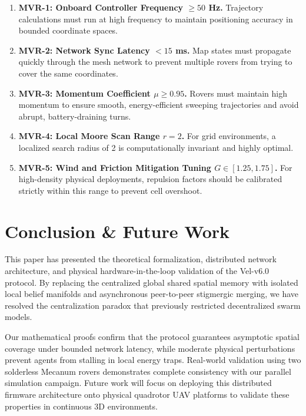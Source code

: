 \documentclass[letterpaper, 10pt, conference]{IEEEtran}
\begin{document}
\begin{enumerate}
    \item \textbf{MVR-1: Onboard Controller Frequency $\geq 50$ Hz.} Trajectory calculations must run at high frequency to maintain positioning accuracy in bounded coordinate spaces.
    \item \textbf{MVR-2: Network Sync Latency $< 15$ ms.} Map states must propagate quickly through the mesh network to prevent multiple rovers from trying to cover the same coordinates.
    \item \textbf{MVR-3: Momentum Coefficient $\mu \geq 0.95$.} Rovers must maintain high momentum to ensure smooth, energy-efficient sweeping trajectories and avoid abrupt, battery-draining turns.
    \item \textbf{MVR-4: Local Moore Scan Range $r = 2$.} For grid environments, a localized search radius of 2 is computationally invariant and highly optimal.
    \item \textbf{MVR-5: Wind and Friction Mitigation Tuning $G \in [1.25, 1.75]$.} For high-density physical deployments, repulsion factors should be calibrated strictly within this range to prevent cell overshoot.
\end{enumerate}

\section{Conclusion \& Future Work}
\label{sec:conclusion}

This paper has presented the theoretical formalization, distributed network architecture, and physical hardware-in-the-loop validation of the Vel-v6.0 protocol. By replacing the centralized global shared spatial memory with isolated local belief manifolds and asynchronous peer-to-peer stigmergic merging, we have resolved the centralization paradox that previously restricted decentralized swarm models.

Our mathematical proofs confirm that the protocol guarantees asymptotic spatial coverage under bounded network latency, while moderate physical perturbations prevent agents from stalling in local energy traps. Real-world validation using two solderless Mecanum rovers demonstrates complete consistency with our parallel simulation campaign. Future work will focus on deploying this distributed firmware architecture onto physical quadrotor UAV platforms to validate these properties in continuous 3D environments.
\end{document}
